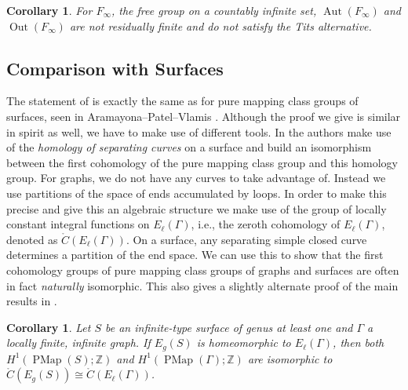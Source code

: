 \documentclass[11pt]{amsart}
\theoremstyle{plain}
\newtheorem{MAINCOR}[MAINTHM]{Corollary}
\theoremstyle{definition}
\DeclareMathOperator{\Aut}{Aut}
\DeclareMathOperator{\Out}{Out}
\DeclareMathOperator{\PMap}{PMap}
\newcommand{\Z}{\mathbb{Z}}
\def\G{{\Gamma}}
\newcommand{\<}{\langle}
\renewcommand{\>}{\rangle}
\newcommand{\cech}{\text{{\v C}ech}}
\newcommand{\dC}{\mathring{C}}
\begin{document}
\begin{MAINCOR}
    For $F_{\infty}$, the free group on a countably infinite set, $\Aut(F_{\infty})$ and $\Out(F_{\infty})$ are not residually finite and do not satisfy the Tits alternative. 
\end{MAINCOR}

\subsection*{Comparison with Surfaces} The statement of  is exactly the same as for pure mapping class groups of surfaces, seen in Aramayona--Patel--Vlamis \cite{APV2020}. Although the proof we give is similar in spirit as well, we have to make use of different tools. In \cite{APV2020} the authors make use of the \emph{homology of separating curves} on a surface and build an isomorphism between the first cohomology of the pure mapping class group and this homology group. For graphs, we do not have any curves to take advantage of. Instead we use partitions of the space of ends accumulated by loops. In order to make this precise and give this an algebraic structure we make use of the group of locally constant integral functions on $E_{\ell}(\G)$, i.e., the zeroth \cech{} cohomology of $E_{\ell}(\G)$, denoted as $\dC(E_{\ell}(\G))$. On a surface, any separating simple closed curve determines a partition of the end space. We can use this to show that the first cohomology groups of pure mapping class groups of graphs and surfaces are often in fact \emph{naturally} isomorphic. This also gives a slightly alternate proof of the main results in \cite{APV2020}. 

\begin{MAINCOR} \label{cor:surfacegraph}
    Let $S$ be an infinite-type surface of genus at least one and $\G$ a locally finite, infinite graph. If $E_{g}(S)$ is homeomorphic to $E_{\ell}(\G)$, then both $H^{1}(\PMap(S);\Z)$ and $H^{1}(\PMap(\G);\Z)$ are isomorphic to $\dC(E_{g}(S)) \cong \dC(E_{\ell}(\G))$.
\end{MAINCOR}
\end{document}
